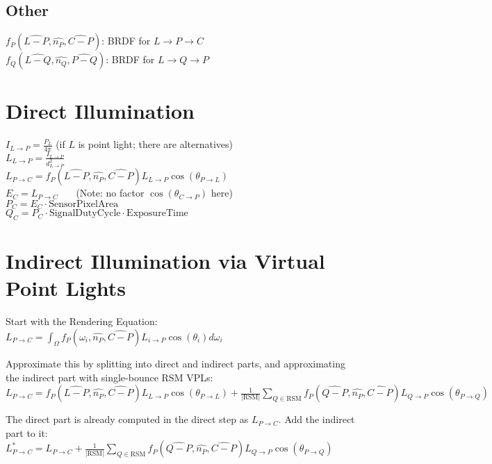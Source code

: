 \documentclass[a4paper,11pt,final]{article}
\begin{document}
\subsection{Other}

$f_P(\widehat{L-P}, \widehat{n_P}, \widehat{C-P})$: BRDF for $L\rightarrow P\rightarrow C$\\
$f_Q(\widehat{L-Q}, \widehat{n_Q}, \widehat{P-Q})$: BRDF for $L\rightarrow Q\rightarrow P$\\


\section{Direct Illumination}

$I_{L\rightarrow P} = \frac{P_L}{4\pi}$ (if $L$ is point light; there are alternatives)\\
$L_{L\rightarrow P} = \frac{I_{L\rightarrow P}}{d^2_{L\rightarrow P}}$\\
$L_{P\rightarrow C} = f_P(\widehat{L-P}, \widehat{n_P}, \widehat{C-P}) L_{L\rightarrow P} \cos(\theta_{P\rightarrow L})$\\
$E_C = L_{P\rightarrow C}$ ~~~(Note: no factor $\cos(\theta_{C\rightarrow P})$ here)\\
$P_C = E_C \cdot \mathrm{SensorPixelArea}$\\
$Q_C = P_C \cdot \mathrm{SignalDutyCycle} \cdot \mathrm{ExposureTime}$


\section{Indirect Illumination via Virtual Point Lights}

Start with the Rendering Equation:\\
$\displaystyle L_{P\rightarrow C} = \int_\Omega f_P(\omega_i, \widehat{n_P}, \widehat{C-P}) L_{i\rightarrow P} \cos(\theta_i) d\omega_i$

\noindent
Approximate this by splitting into direct and indirect parts, and approximating
the indirect part with single-bounce RSM VPLs:\\
$\displaystyle L_{P\rightarrow C} = f_P(\widehat{L-P}, \widehat{n_P}, \widehat{C-P}) L_{L\rightarrow P} \cos(\theta_{P\rightarrow L})
 + \frac{1}{|\mathrm{RSM}|}\sum_{Q\in \mathrm{RSM}} f_P(\widehat{Q-P}, \widehat{n_P}, \widehat{C-P}) L_{Q\rightarrow P} \cos(\theta_{P\rightarrow Q})$

\noindent
The direct part is already computed in the direct step as $L_{P\rightarrow C}$. Add the indirect part to it:\\
$\displaystyle L^*_{P\rightarrow C} = L_{P\rightarrow C}
 + \frac{1}{|\mathrm{RSM}|}\sum_{Q\in \mathrm{RSM}} f_P(\widehat{Q-P}, \widehat{n_P}, \widehat{C-P}) L_{Q\rightarrow P} \cos(\theta_{P\rightarrow Q})$
\end{document}
